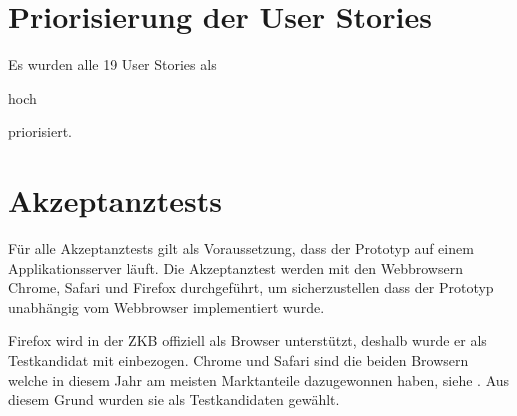 \section{Priorisierung der User Stories}

Es wurden alle 19 User Stories als \begin{itshape}hoch\end{itshape} priorisiert.

\section{Akzeptanztests}

Für alle Akzeptanztests gilt als Voraussetzung, dass der Prototyp auf einem
Applikationsserver läuft. Die Akzeptanztest werden mit den Webbrowsern Chrome,
Safari und Firefox durchgeführt, um sicherzustellen dass der Prototyp unabhängig
vom Webbrowser implementiert wurde.

Firefox wird in der \ac{ZKB} offiziell als Browser unterstützt, deshalb wurde
er als Testkandidat mit einbezogen. Chrome und Safari sind die beiden Browsern
welche in diesem Jahr am meisten Marktanteile dazugewonnen haben, siehe
\cite{BrowserStatistik}. Aus diesem Grund wurden sie als Testkandidaten gewählt.

